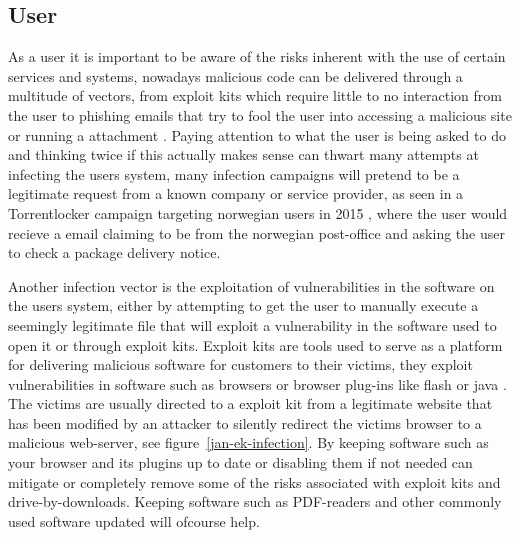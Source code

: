 \subsection{User}
As a user it is important to be aware of the risks inherent with the use of certain services and systems, nowadays malicious code can be delivered through a multitude of vectors, from exploit kits which require little to no interaction from the user to phishing emails that try to fool the user into accessing a malicious site or running a attachment \cite{jan-brewer}. 
Paying attention to what the user is being asked to do and thinking twice if this actually makes sense can thwart many attempts at infecting the users system, many infection campaigns will pretend to be a legitimate request from a known company or service provider, as seen in a Torrentlocker campaign targeting norwegian users in 2015 \cite{jan-nsm-ransomware}, where the user would recieve a email claiming to be from the norwegian post-office and asking the user to check a package delivery notice. 

Another infection vector is the exploitation of vulnerabilities in the software on the users system, either by attempting to get the user to manually execute a seemingly legitimate file that will exploit a vulnerability in the software used to open it or through exploit kits.
Exploit kits are tools used to serve as a platform for delivering malicious software for customers to their victims, they exploit vulnerabilities in software such as browsers or browser plug-ins like flash or java \cite{jan-kotov-ek}. The victims are usually directed to a exploit kit from a legitimate website that has been modified by an attacker to silently redirect the victims browser to a malicious web-server, see figure~\ref{jan-ek-infection}. By keeping software such as your browser and its plugins up to date or disabling them if not needed can mitigate or completely remove some of the risks associated with exploit kits and drive-by-downloads. Keeping software such as PDF-readers and other commonly used software updated will ofcourse help.


